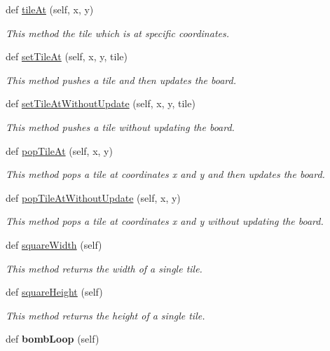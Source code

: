 \begin{DoxyCompactItemize}
def \hyperlink{classsrc_1_1board_1_1_board_afc740240caba216e9b416bdae675aab6}{tile\+At} (self, x, y)
\begin{DoxyCompactList}\small\item\em This method the tile which is at specific coordinates. \end{DoxyCompactList}\item 
def \hyperlink{classsrc_1_1board_1_1_board_ac40120a47f2787cb730e2d945e8833ee}{set\+Tile\+At} (self, x, y, tile)
\begin{DoxyCompactList}\small\item\em This method pushes a tile and then updates the board. \end{DoxyCompactList}\item 
def \hyperlink{classsrc_1_1board_1_1_board_a78d9960666f0be862cad75c855a38709}{set\+Tile\+At\+Without\+Update} (self, x, y, tile)
\begin{DoxyCompactList}\small\item\em This method pushes a tile without updating the board. \end{DoxyCompactList}\item 
def \hyperlink{classsrc_1_1board_1_1_board_af2e08aecc48abfbb38dfcc2dbc11b7cd}{pop\+Tile\+At} (self, x, y)
\begin{DoxyCompactList}\small\item\em This method pops a tile at coordinates x and y and then updates the board. \end{DoxyCompactList}\item 
def \hyperlink{classsrc_1_1board_1_1_board_a84399c357c601a4cf2f64dd096c2adc7}{pop\+Tile\+At\+Without\+Update} (self, x, y)
\begin{DoxyCompactList}\small\item\em This method pops a tile at coordinates x and y without updating the board. \end{DoxyCompactList}\item 
def \hyperlink{classsrc_1_1board_1_1_board_a4d2d336061f0136c40c42f491e11ad02}{square\+Width} (self)
\begin{DoxyCompactList}\small\item\em This method returns the width of a single tile. \end{DoxyCompactList}\item 
def \hyperlink{classsrc_1_1board_1_1_board_a1e964f3382db079501c6b4afa16348e4}{square\+Height} (self)
\begin{DoxyCompactList}\small\item\em This method returns the height of a single tile. \end{DoxyCompactList}\item 
\hypertarget{classsrc_1_1board_1_1_board_a7734f1ae8cb324abbafc0e1af7f4db6f}{}def {\bfseries bomb\+Loop} (self)\label{classsrc_1_1board_1_1_board_a7734f1ae8cb324abbafc0e1af7f4db6f}


\end{DoxyCompactItemize}
